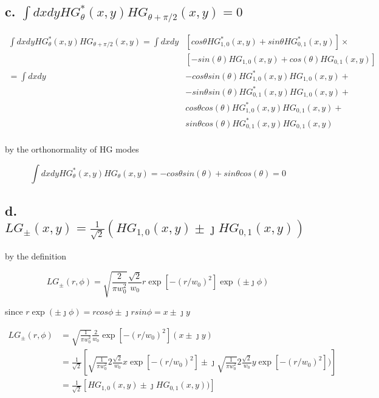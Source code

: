 \documentclass[12pt]{article}
\begin{document}
\begin{flushleft}
\subsection*{c. $\int dxdy HG^*_\theta(x, y)HG_{\theta + \pi/2}(x, y) = 0$}

\begin{align*}
    \int dxdy HG^*_\theta(x, y)HG_{\theta + \pi/2}(x, y) = \int dxdy& \left[cos\theta HG^*_{1,0}(x, y) +  sin\theta HG^*_{0,1}(x, y)\right]\times\\&\left[-sin(\theta) HG_{1,0}(x, y) + cos(\theta) HG_{0,1}(x, y)\right]\\
    = \int dxdy& -cos\theta sin(\theta) HG^*_{1,0}(x, y)HG_{1,0}(x, y)  +\\
    &-sin\theta sin(\theta) HG^*_{0,1}(x, y)HG_{1,0}(x, y) +\\
    &cos\theta cos(\theta) HG^*_{1,0}(x, y)HG_{0,1}(x, y) + \\
    &sin\theta cos(\theta) HG^*_{0,1}(x, y)HG_{0,1}(x, y)\\
\end{align*}

by the orthonormality of HG modes

\[
    \int dxdy HG^*_\theta(x, y)HG_\theta(x, y) = -cos\theta sin(\theta) + sin\theta cos(\theta)  = 0
\]

\subsection*{d. $LG_{\pm}(x, y) = \frac{1}{\sqrt{2}}(HG_{1,0}(x, y) \pm \jmath HG_{0,1}(x, y))$}

by the definition

\[
    LG_\pm(r, \phi) = \sqrt{\frac{2}{\pi w_0^2}}\frac{\sqrt{2}}{w_0}r\exp\left[-(r / w_0) ^ 2\right]\exp(\pm\jmath\phi)
\]

since $r\exp(\pm\jmath\phi) = r cos \phi \pm \jmath r sin\phi = x \pm \jmath y$

\begin{align*}
    LG_\pm(r, \phi) &= \sqrt{\frac{1}{\pi w_0^2}}\frac{2}{w_0}\exp\left[-(r / w_0) ^ 2\right](x \pm \jmath y)\\
    &= \frac{1}{\sqrt{2}}\left[\sqrt{\frac{1}{\pi w_0^2}}2\frac{\sqrt{2}}{w_0}x\exp\left[-(r / w_0) ^ 2\right] \pm \jmath \sqrt{\frac{1}{\pi w_0^2}}2\frac{\sqrt{2}}{w_0}y\exp\left[-(r / w_0) ^ 2\right])\right]\\
    &= \frac{1}{\sqrt{2}}\left[HG_{1,0}(x, y) \pm \jmath HG_{0,1}(x, y))\right]\\
\end{align*}


\end{flushleft}
\end{document}
